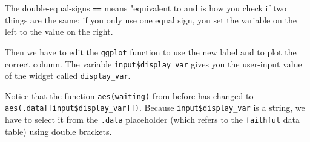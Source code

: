 \documentclass[
]{book}
\newenvironment{Shaded}{\begin{snugshade}}{\end{snugshade}}
\newcommand{\AttributeTok}[1]{\textcolor[rgb]{0.77,0.63,0.00}{#1}}
\newcommand{\CommentTok}[1]{\textcolor[rgb]{0.56,0.35,0.01}{\textit{#1}}}
\newcommand{\ControlFlowTok}[1]{\textcolor[rgb]{0.13,0.29,0.53}{\textbf{#1}}}
\newcommand{\FunctionTok}[1]{\textcolor[rgb]{0.00,0.00,0.00}{#1}}
\newcommand{\NormalTok}[1]{#1}
\newcommand{\OtherTok}[1]{\textcolor[rgb]{0.56,0.35,0.01}{#1}}
\newcommand{\SpecialCharTok}[1]{\textcolor[rgb]{0.00,0.00,0.00}{#1}}
\newcommand{\StringTok}[1]{\textcolor[rgb]{0.31,0.60,0.02}{#1}}
\begin{document}
\begin{Shaded}
\end{Shaded}

The double-equal-signs \texttt{==} means "equivalent to and is how you check if two things are the same; if you only use one equal sign, you set the variable on the left to the value on the right.

Then we have to edit the \texttt{ggplot} function to use the new label and to plot the correct column. The variable \texttt{input\$display\_var} gives you the user-input value of the widget called \texttt{display\_var}.

\begin{Shaded}
\end{Shaded}

Notice that the function \texttt{aes(waiting)} from before has changed to \texttt{aes(.data{[}{[}input\$display\_var{]}{]})}. Because \texttt{input\$display\_var} is a string, we have to select it from the \texttt{.data} placeholder (which refers to the \texttt{faithful} data table) using double brackets.
\end{document}
